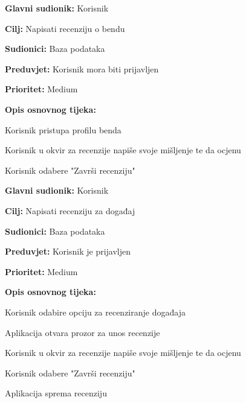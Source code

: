 \noindent {}
	\begin{packed_item}
		
		\item \textbf{Glavni sudionik:} Korisnik
		\item \textbf{Cilj:} Napisati recenziju o bendu
		\item \textbf{Sudionici:} Baza podataka
		\item \textbf{Preduvjet:} Korisnik mora biti prijavljen
		\item \textbf{Prioritet:} Medium
		\item \textbf{Opis osnovnog tijeka:} 
		
		\item[] \begin{packed_enum}
			
			\item Korisnik pristupa profilu benda
			\item Korisnik u okvir za recenzije napiše svoje mišljenje te da ocjenu
			\item Korisnik odabere "Završi recenziju"
		\end{packed_enum}
	\end{packed_item}
				
\noindent {}
	\begin{packed_item}
		
		\item \textbf{Glavni sudionik:} Korisnik
		\item \textbf{Cilj:} Napisati recenziju za događaj
		\item \textbf{Sudionici:} Baza podataka
		\item \textbf{Preduvjet:} Korisnik je prijavljen
		\item \textbf{Prioritet:} Medium
		\item \textbf{Opis osnovnog tijeka:} 
		
		\item[] \begin{packed_enum}
			
			\item Korisnik odabire opciju za recenziranje događaja
			\item Aplikacija otvara prozor za unos recenzije
			\item Korisnik u okvir za recenzije napiše svoje mišljenje te da ocjenu
			\item Korisnik odabere "Završi recenziju"
			\item Aplikacija sprema recenziju
		\end{packed_enum}
	\end{packed_item}
		 
